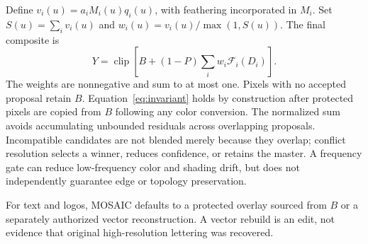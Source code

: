 \documentclass[10pt,twocolumn]{article}
\begin{document}
Define $v_i(u)=a_i M_i(u)q_i(u)$, with feathering incorporated in $M_i$. Set $S(u)=\sum_i v_i(u)$ and $w_i(u)=v_i(u)/\max(1,S(u))$. The final composite is
\begin{equation}
Y=\operatorname{clip}\left[B+(1-P)\sum_i w_i\mathcal F_i(D_i)\right].
\label{eq:composite}
\end{equation}
The weights are nonnegative and sum to at most one. Pixels with no accepted proposal retain $B$. Equation~\eqref{eq:invariant} holds by construction after protected pixels are copied from $B$ following any color conversion. The normalized sum avoids accumulating unbounded residuals across overlapping proposals. Incompatible candidates are not blended merely because they overlap; conflict resolution selects a winner, reduces confidence, or retains the master. A frequency gate can reduce low-frequency color and shading drift, but does not independently guarantee edge or topology preservation.

For text and logos, MOSAIC defaults to a protected overlay sourced from $B$ or a separately authorized vector reconstruction. A vector rebuild is an edit, not evidence that original high-resolution lettering was recovered.
\end{document}
